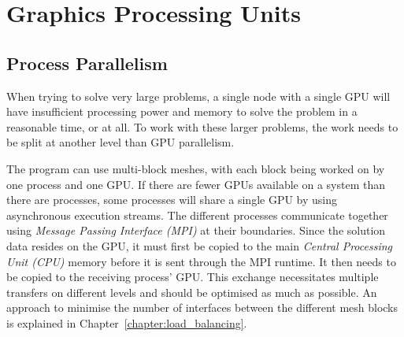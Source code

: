 \chapter{Graphics Processing Units} \label{chapter:graphics_processing_units} 

\section{Process Parallelism} \label{section:process_parallelism}
When trying to solve very large problems, a single node with a single GPU will have insufficient
processing power and memory to solve the problem in a reasonable time, or at all. To work with these
larger problems, the work needs to be split at another level than GPU parallelism.  

The program can use multi-block meshes, with each block being worked on by one process and one GPU.
If there are fewer GPUs available on a system than there are processes, some processes will share a
single GPU by using asynchronous execution streams. The different processes communicate together
using \textit{Message Passing Interface (MPI)} at their boundaries. Since the solution data resides
on the GPU, it must first be copied to the main \textit{Central Processing Unit (CPU)} memory before
it is sent through the MPI runtime. It then needs to be copied to the receiving process' GPU. This
exchange necessitates multiple transfers on different levels and should be optimised as much as
possible. An approach to minimise the number of interfaces between the different mesh blocks is
explained in Chapter~\ref{chapter:load_balancing}.